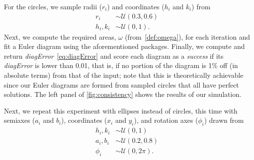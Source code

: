 \documentclass[
  oneside,
  usegeometry,
  numbers=noendperiod,
  openany,
  parskip=half
]{scrbook}\usepackage[]{graphicx}\usepackage{xcolor}
\begin{document}
For the circles, we sample radii ($r_i$) and coordinates ($h_i$ and $k_i$) from
\begin{equation}
\begin{aligned}
r_i     & \sim \mathcal{U}(0.3, 0.6)\\
h_i,k_i & \sim \mathcal{U}(0, 1).
\end{aligned}
\label{eq:consistencyCircles}
\end{equation}
Next, we compute the required areas, $\omega$ (from~\cref{def:omega}), for each iteration and fit a Euler diagram using the aforementioned packages. Finally, we compute and return \emph{diagError}~\eqref{eq:diagError} and score each diagram as a \emph{success} if its \emph{diagError} is lower than 0.01, that is, if no portion of the diagram is 1\% off (in absolute terms) from that of the input; note that this is theoretically achievable since our Euler diagrams are formed from sampled circles that all have perfect solutions. The left panel of \cref{fig:consistency} shows the results of our simulation.

Next, we repeat this experiment with ellipses instead of circles, this time with semiaxes ($a_i$ and $b_i$), coordinates ($x_i$ and $y_i$), and rotation axes ($\phi_i$) drawn from
%
\begin{equation}
\begin{aligned}
h_i,k_i & \sim \mathcal{U}(0, 1)\\
a_i,b_i & \sim \mathcal{U}(0.2, 0.8)\\
\phi_i  & \sim \mathcal{U}(0, 2\pi).
\end{aligned}
\label{eq:consistencyEllipses}
\end{equation}
%
%
%
\end{document}
